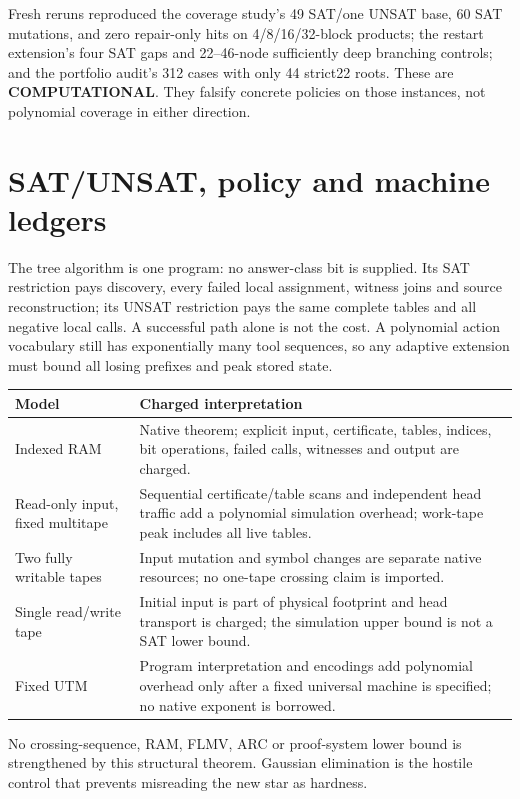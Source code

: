 \documentclass[11pt]{article}
\begin{document}
Fresh reruns reproduced the coverage study's 49 SAT/one UNSAT base, 60 SAT
mutations, and zero repair-only hits on 4/8/16/32-block products; the restart
extension's four SAT gaps and 22--46-node sufficiently deep branching
controls; and the portfolio audit's 312 cases with only 44 strict22 roots.
These are \textbf{COMPUTATIONAL}.  They falsify concrete policies on those
instances, not polynomial coverage in either direction.

\section{SAT/UNSAT, policy and machine ledgers}
The tree algorithm is one program: no answer-class bit is supplied.  Its SAT
restriction pays discovery, every failed local assignment, witness joins and
source reconstruction; its UNSAT restriction pays the same complete tables
and all negative local calls.  A successful path alone is not the cost.  A
polynomial action vocabulary still has exponentially many tool sequences, so
any adaptive extension must bound all losing prefixes and peak stored state.

\begin{center}
\begin{tabular}{p{.20\linewidth}p{.72\linewidth}}
\toprule
Model & Charged interpretation \\
\midrule
Indexed RAM & Native theorem; explicit input, certificate, tables, indices,
bit operations, failed calls, witnesses and output are charged. \\
Read-only input, fixed multitape & Sequential certificate/table scans and
independent head traffic add a polynomial simulation overhead; work-tape peak
includes all live tables. \\
Two fully writable tapes & Input mutation and symbol changes are separate
native resources; no one-tape crossing claim is imported. \\
Single read/write tape & Initial input is part of physical footprint and head
transport is charged; the simulation upper bound is not a SAT lower bound. \\
Fixed UTM & Program interpretation and encodings add polynomial overhead only
after a fixed universal machine is specified; no native exponent is borrowed. \\
\bottomrule
\end{tabular}
\end{center}

No crossing-sequence, RAM, FLMV, ARC or proof-system lower bound is strengthened
by this structural theorem.  Gaussian elimination is the hostile control that
prevents misreading the new star as hardness.
\end{document}
